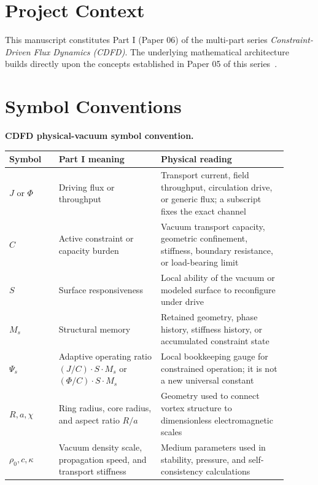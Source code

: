 \documentclass[11pt]{article}
\begin{document}
\section*{Project Context}
This manuscript constitutes Part I (Paper 06) of the multi-part series
\textit{Constraint-Driven Flux Dynamics (CDFD)}. The underlying mathematical
architecture builds directly upon the concepts established in Paper 05 of this
series~\cite{MujjabiV2026}.

\section*{Symbol Conventions}

\noindent\textbf{CDFD physical-vacuum symbol convention.}
\begin{center}
{\small
\begin{tabular}{p{0.16\linewidth}p{0.33\linewidth}p{0.41\linewidth}}
\hline
Symbol & Part I meaning & Physical reading \\
\hline
$J$ or $\Phi$ & Driving flux or throughput & Transport current, field throughput, circulation drive, or generic flux; a subscript fixes the exact channel \\
$C$ & Active constraint or capacity burden & Vacuum transport capacity, geometric confinement, stiffness, boundary resistance, or load-bearing limit \\
$S$ & Surface responsiveness & Local ability of the vacuum or modeled surface to reconfigure under drive \\
$M_s$ & Structural memory & Retained geometry, phase history, stiffness history, or accumulated constraint state \\
$\Psi_s$ & Adaptive operating ratio $(J/C)\cdot S\cdot M_s$ or $(\Phi/C)\cdot S\cdot M_s$ & Local bookkeeping gauge for constrained operation; it is not a new universal constant \\
$R,a,\chi$ & Ring radius, core radius, and aspect ratio $R/a$ & Geometry used to connect vortex structure to dimensionless electromagnetic scales \\
$\rho_0,c,\kappa$ & Vacuum density scale, propagation speed, and transport stiffness & Medium parameters used in stability, pressure, and self-consistency calculations \\
\hline
\end{tabular}
}
\end{center}
\end{document}
